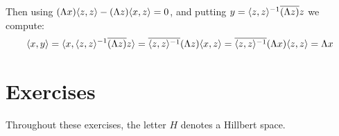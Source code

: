 Then using \((\Lambda x)\langle z,z \rangle - (\Lambda z)\langle x, z \rangle = 0\),
and putting \(y = \langle z, z \rangle^{-1}\overline{\left(\Lambda z\right)}z\)
we compute:
\begin{equation*}
\langle x, y \rangle
  = \langle x, \langle z, z \rangle^{-1}\overline{\left(\Lambda z\right)}z \rangle
  = \overline{\langle z, z \rangle^{-1}}(\Lambda z)\langle x, z \rangle
  = \overline{\langle z, z \rangle^{-1}}(\Lambda x)\langle z, z \rangle
  = \Lambda x
\end{equation*}
\unfinished

\section{Exercises} %

Throughout these exercises, the letter $H$ denotes a Hillbert space.

